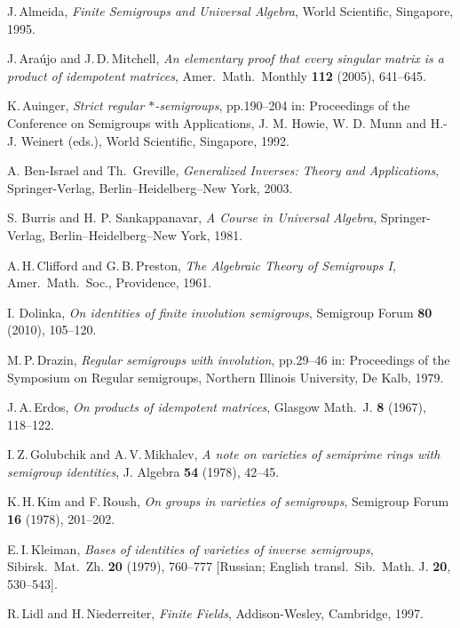 \documentclass[11pt,reqno]{amsart}
\numberwithin{equation}{section}
\theoremstyle{remark}
\begin{document}
\begin{thebibliography}{99}

J.\,Almeida, \emph{Finite Semigroups and Universal Algebra}, World
Scientific, Singapore, 1995.

J.\,Ara\'ujo and J.\,D.\,Mitchell, \emph{An elementary proof that
every singular matrix is a product of idempotent matrices}, Amer.\
Math.\ Monthly \textbf{112} (2005), 641--645.

K.\,Auinger, \emph{Strict regular $*$-semigroups}, pp.190--204 in:
Proceedings of the Conference on Semigroups with Applications, J.
M. Howie, W. D. Munn and H.-J. Weinert (eds.), World Scientific,
Singapore, 1992.

A. Ben-Israel and Th.\ Greville, \emph{Generalized Inverses:
Theory and Applications}, Springer-Verlag, Berlin--Heidelberg--New
York, 2003.

S. Burris and H. P. Sankappanavar, \emph{A Course in Universal
Algebra}, Springer-Verlag, Berlin--Heidelberg--New York, 1981.

A.\,H.\,Clifford and G.\,B.\,Preston, \emph{The Algebraic Theory
of Semigroups I}, Amer.\ Math.\ Soc., Providence, 1961.

I. Dolinka, \emph{On identities of finite involution semigroups}, Semigroup Forum \textbf{80} (2010), 105--120.

M.\,P.\,Drazin, \emph{Regular semigroups with involution},
pp.29--46 in: Proceedings of the Symposium on Regular semigroups,
Northern Illinois University, De Kalb, 1979.

J.\,A.\,Erdos, \emph{On products of idempotent matrices}, Glasgow
Math.\ J. \textbf{8} (1967), 118--122.

I.\,Z.\,Golubchik and A.\,V.\,Mikhalev, \emph{A note on varieties
of semiprime rings with semigroup identities}, J. Algebra
\textbf{54} (1978), 42--45.

K.\,H.\,Kim and F.\,Roush, \emph{On groups in varieties of
semigroups}, Semigroup Forum \textbf{ 16} (1978), 201--202.

E.\,I.\,Kleiman, \emph{Bases of identities of varieties of inverse
semigroups}, Sibirsk.\ Mat.\ Zh. \textbf{20} (1979), 760--777
[Russian; English transl.\ Sib.\ Math. J. \textbf{20}, 530--543].

R.\,Lidl and H.\,Niederreiter, \emph{Finite Fields},
Addison-Wesley, Cambridge, 1997.


\end{thebibliography}
\end{document}
